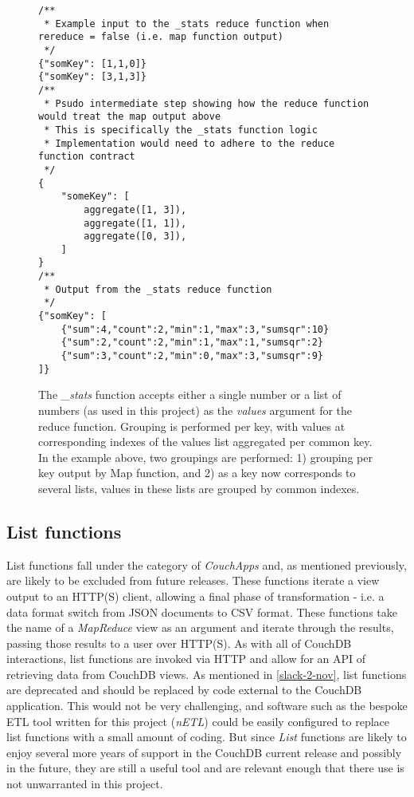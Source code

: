 \begin{figure}[ht]
    \begin{verbatim}
/**
 * Example input to the _stats reduce function when rereduce = false (i.e. map function output)
 */
{"somKey": [1,1,0]}
{"somKey": [3,1,3]}
/**
 * Psudo intermediate step showing how the reduce function would treat the map output above
 * This is specifically the _stats function logic
 * Implementation would need to adhere to the reduce function contract
 */
{
    "someKey": [
        aggregate([1, 3]),
        aggregate([1, 1]),
        aggregate([0, 3]),
    ]
}
/**
 * Output from the _stats reduce function
 */
{"somKey": [
    {"sum":4,"count":2,"min":1,"max":3,"sumsqr":10}
    {"sum":2,"count":2,"min":1,"max":1,"sumsqr":2}
    {"sum":3,"count":2,"min":0,"max":3,"sumsqr":9}
]}
    \end{verbatim}
    \caption[\textit{\_stats} function contract]{The \textit{\_stats} function accepts either a single number or a list of numbers (as used in this project) as the \textit{values} argument for the reduce function. Grouping is performed per key, with values at corresponding indexes of the values list aggregated per common key. In the example above, two groupings are performed: 1) grouping per key output by Map function, and 2) as a key now corresponds to several lists, values in these lists are grouped by common indexes.}
    \label{stats-reduce-fn}
\end{figure}



\subsection{List functions}
List functions fall under the category of \textit{CouchApps} and, as mentioned previously, are likely to be excluded from future releases. These functions iterate a view output to an HTTP(S) client, allowing a final phase of transformation - i.e. a data format switch from JSON documents to CSV format. These  functions take the name of a \textit{MapReduce} view as an argument and iterate through the results, passing those results to a user over HTTP(S). As with all of CouchDB interactions, list functions are invoked via HTTP and allow for an API of retrieving data from CouchDB views. As mentioned in \ref{slack-2-nov}, list functions are deprecated and should be replaced by code external to the CouchDB application. This would not be very challenging, and software such as the bespoke ETL tool written for this project (\textit{nETL}) could be easily configured to replace list functions with a small amount of coding. But since \textit{List} functions are likely to enjoy several more years of support in the CouchDB current release and possibly in the future, they are still a useful tool and are relevant enough that there use is not unwarranted in this project.